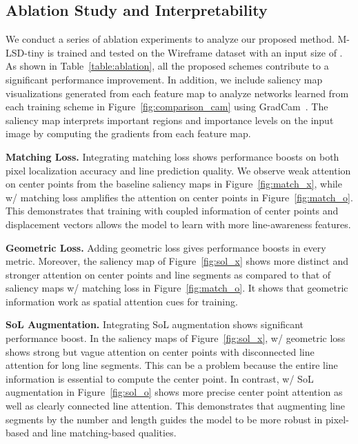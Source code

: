 \documentclass[letterpaper]{article} \usepackage{aaai22}  \usepackage{times}  \usepackage{helvet}  \usepackage{courier}  \usepackage[hyphens]{url}  \usepackage{graphicx} \urlstyle{rm} \def\UrlFont{\rm}  \usepackage{natbib}  \usepackage{caption} \DeclareCaptionStyle{ruled}{labelfont=normalfont,labelsep=colon,strut=off} \frenchspacing  \setlength{\pdfpagewidth}{8.5in}  \setlength{\pdfpageheight}{11in}  \usepackage{algorithm}
\begin{document}
\subsection{Ablation Study and Interpretability}
\label{sec:ablation}
We conduct a series of ablation experiments to analyze our proposed method.
M-LSD-tiny is trained and tested on the Wireframe dataset with an input size of .
As shown in Table~\ref{table:ablation}, all the proposed schemes contribute to a significant performance improvement.
In addition, we include saliency map visualizations generated from each feature map to analyze networks learned from each training scheme in Figure~\ref{fig:comparison_cam} using GradCam~\cite{selvaraju2017grad}.
The saliency map interprets important regions and importance levels on the input image by computing the gradients from each feature map.

\begin{comment}
\textbf{Baseline and Augmentation. }
The baseline model is trained with M-LSD-tiny backbone, including only the TP representation and no other proposed schemes.
We observe that adding horizontal and vertical flips, shearing, rotation, and scaling input augmentation on the baseline model shows small performance improvement.
\end{comment}

\textbf{Matching Loss. }
Integrating matching loss shows performance boosts on both pixel localization accuracy and line prediction quality.
We observe weak attention on center points from the baseline saliency maps in Figure~\ref{fig:match_x}, while w/ matching loss amplifies the attention on center points in Figure~\ref{fig:match_o}.
This demonstrates that training with coupled information of center points and displacement vectors allows the model to learn with more line-awareness features.

\textbf{Geometric Loss. }
Adding geometric loss gives performance boosts in every metric.
Moreover, the saliency map of Figure~\ref{fig:sol_x} shows more distinct and stronger attention on center points and line segments as compared to that of saliency maps w/ matching loss in Figure~\ref{fig:match_o}.
It shows that geometric information work as spatial attention cues for training.

\textbf{SoL Augmentation. }
Integrating SoL augmentation shows significant performance boost.
In the saliency maps of Figure~\ref{fig:sol_x}, w/ geometric loss shows strong but vague attention on center points with disconnected line attention for long line segments.
This can be a problem because the entire line information is essential to compute the center point.
In contrast, w/ SoL augmentation in Figure~\ref{fig:sol_o} shows more precise center point attention as well as clearly connected line attention.
This demonstrates that augmenting line segments by the number and length guides the model to be more robust in pixel-based and line matching-based qualities.
\end{document}
